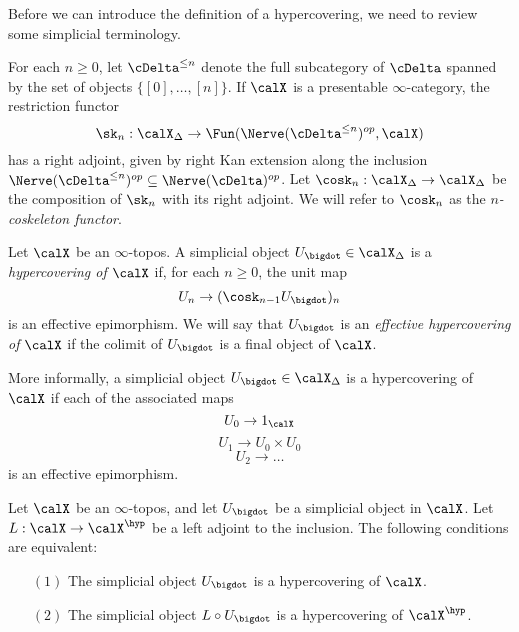 Before we can introduce the definition of a hypercovering, we need to review some simplicial terminology.

\begin{notation}
For each $n \geq 0$, let $\cDelta^{\leq n}$ denote the full
subcategory of $\cDelta$ spanned by the set of objects
$\{ [0], \ldots, [n] \}$. 
If $\calX$ is a presentable $\infty$-category, the 
restriction functor
$$ \sk_n: \calX_{\Delta} \rightarrow \Fun(\Nerve (\cDelta^{\leq n})^{op}, \calX)$$
has a right adjoint, given by right Kan extension along the inclusion $\Nerve (\cDelta^{\leq n})^{op} \subseteq \Nerve(\cDelta)^{op}$. Let $\cosk_n: \calX_{\Delta} \rightarrow \calX_{\Delta}$ be the composition of $\sk_n$ with its right adjoint. We will refer to $\cosk_{n}$ as the {\it $n$-coskeleton functor}.
\end{notation}

\begin{definition}\label{worum}
Let $\calX$ be an $\infty$-topos. A simplicial object $U_{\bigdot} \in \calX_{\Delta}$ is a {\it hypercovering of $\calX$} if, for each $n \geq 0$, the unit map
$$ U_{n} \rightarrow ( \cosk_{n-1} U_{\bigdot} )_n $$
is an effective epimorphism. We will say that $U_{\bigdot}$ is an {\em effective hypercovering of $\calX$}
if the colimit of $U_{\bigdot}$ is a final object of $\calX$.
\end{definition}

\begin{remark}
More informally, a simplicial object $U_{\bigdot} \in \calX_{\Delta}$ is a hypercovering of $\calX$ if each of the associated maps
$$ U_0 \rightarrow 1_{\calX}$$
$$ U_1 \rightarrow U_0 \times U_0 $$
$$ U_2 \rightarrow \ldots $$
is an effective epimorphism.
\end{remark}

\begin{lemma}\label{fier1}
Let $\calX$ be an $\infty$-topos, and let $U_{\bigdot}$ be a simplicial object
in $\calX$.  Let $L: \calX \rightarrow \calX^{\hyp}$ be a left adjoint to the inclusion. The following conditions are equivalent:
\begin{itemize}
\item[$(1)$] The simplicial object $U_{\bigdot}$ is a hypercovering of $\calX$.
\item[$(2)$] The simplicial object $L \circ U_{\bigdot}$ is a hypercovering
of $\calX^{\hyp}$.
\end{itemize}
\end{lemma}

